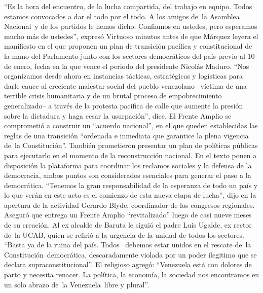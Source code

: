 \documentclass{article}%
\begin{document}
\newline%
%
“Es la hora del encuentro, de la lucha compartida, del trabajo en equipo. Todos estamos convocados a dar el todo por el todo. A los amigos de~la Asamblea Nacional~y de los partidos le hemos dicho: Confiamos en ustedes, pero esperamos mucho más de ustedes”, expresó Virtuoso minutos antes de que Márquez leyera el manifiesto en el que proponen un plan de transición pacífica y constitucional de la mano del Parlamento junto con los sectores democráticos del país previo al 10 de enero, fecha en la que vence el periodo del presidente Nicolás Maduro.%
\newline%
%
“Nos organizamos desde ahora en instancias tácticas, estratégicas y logísticas para darle cauce al creciente malestar social del pueblo venezolano –víctima de una terrible crisis humanitaria y de un brutal proceso de empobrecimiento generalizado– a través de la protesta pacífica de calle que aumente la presión sobre la dictadura y haga cesar la usurpación”, dice.%
\newline%
%
El Frente Amplio se comprometió a construir un “acuerdo nacional”, en el que queden establecidas las reglas de una transición “ordenada e inmediata que garantice la plena vigencia de~la Constitución”. También prometieron presentar un plan de políticas públicas para ejecutarlo en el momento de la reconstrucción nacional.%
\newline%
%
En el texto ponen a disposición la plataforma para coordinar los reclamos sociales y la defensa de la democracia, ambos puntos son considerados esenciales para generar el paso a la democrática.%
\newline%
%
“Tenemos la gran responsabilidad de la esperanza de todo un país y lo que verán en este acto es el comienzo de esta nueva etapa de lucha”, dijo en la apertura de la actividad Gerardo Blyde, coordinador de los congresos regionales. Aseguró que entrega un Frente Amplio “revitalizado” luego de casi nueve meses de su creación.%
\newline%
%
Al ex alcalde de Baruta le siguió el padre Luis Ugalde, ex rector de~la UCAB, quien se refirió a la urgencia de la unidad de todos los sectores. “Basta ya de la ruina del país. Todos ~debemos estar unidos en el rescate de~la Constitución~democrática, descaradamente violada por un poder ilegitimo que se declara supraconstitucional”.%
\newline%
%
El religioso agregó: “Venezuela está con dolores de parto y necesita renacer. La política, la economía, la sociedad nos encontramos en un solo abrazo de~la Venezuela~libre y plural”.%
\end{document}
